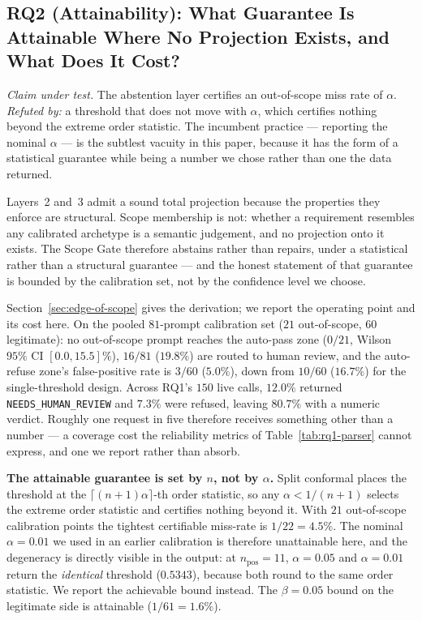 \documentclass[journal, 10pt]{IEEEtran}
\begin{document}
\subsection{RQ2 (Attainability): What Guarantee Is Attainable Where No Projection Exists, and What Does It Cost?}
\label{sec:rq2}

\emph{Claim under test.} The abstention layer certifies an out-of-scope miss rate
of $\alpha$. \emph{Refuted by:} a threshold that does not move with $\alpha$,
which certifies nothing beyond the extreme order statistic. The incumbent
practice --- reporting the nominal $\alpha$ --- is the subtlest vacuity in this
paper, because it has the form of a statistical guarantee while being a number we
chose rather than one the data returned.

Layers~2 and~3 admit a sound total projection because the properties they enforce
are structural. Scope membership is not: whether a requirement resembles any
calibrated archetype is a semantic judgement, and no projection onto it exists.
The Scope Gate therefore abstains rather than repairs, under a statistical rather
than a structural guarantee --- and the honest statement of that guarantee is
bounded by the calibration set, not by the confidence level we choose.

Section~\ref{sec:edge-of-scope} gives the derivation; we report the operating
point and its cost here. On the pooled $81$-prompt calibration set
($21$ out-of-scope, $60$ legitimate): no out-of-scope prompt reaches the
auto-pass zone ($0/21$, Wilson $95\%$ CI $[0.0,15.5]\%$), $16/81$ ($19.8\%$) are
routed to human review, and the auto-refuse zone's false-positive rate is
$3/60$ ($5.0\%$), down from $10/60$ ($16.7\%$) for the single-threshold design.
Across RQ1's $150$ live calls, $12.0\%$ returned \texttt{NEEDS\_HUMAN\_REVIEW}
and $7.3\%$ were refused, leaving $80.7\%$ with a numeric verdict. Roughly one
request in five therefore receives something other than a number --- a coverage
cost the reliability metrics of Table~\ref{tab:rq1-parser} cannot express, and one we
report rather than absorb.

\textbf{The attainable guarantee is set by $n$, not by $\alpha$.} Split conformal
places the threshold at the $\lceil (n{+}1)\alpha \rceil$-th order statistic, so
any $\alpha < 1/(n{+}1)$ selects the extreme order statistic and certifies
nothing beyond it. With $21$ out-of-scope calibration points the tightest
certifiable miss-rate is $1/22 = 4.5\%$. The nominal $\alpha = 0.01$ we used in
an earlier calibration is therefore unattainable here, and the degeneracy is
directly visible in the output: at $n_{\text{pos}}=11$, $\alpha = 0.05$ and
$\alpha = 0.01$ return the \emph{identical} threshold ($0.5343$), because both
round to the same order statistic. We report the achievable bound instead. The
$\beta = 0.05$ bound on the legitimate side is attainable ($1/61 = 1.6\%$).
\end{document}
